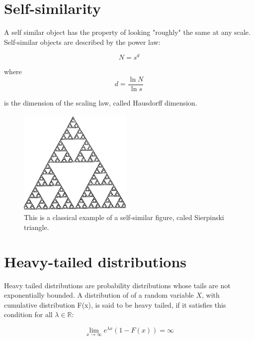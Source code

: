 \section{Self-similarity}

A self similar object has the property of looking "roughly" the same at any scale. Self-similar objects are described by the power law:

\begin{equation}
	N = s^{d}
\end{equation}

where 
\begin{equation}
	d = \frac{\ln{N}}{\ln{s}}
\end{equation}

is the dimension of the scaling law, called  Hausdorff dimension\cite{web-self-similar}. 


\begin{figure}[ht!]
	\centering
	\includegraphics[height=2.0in]{figures/apA/tritrans}
	\caption{This is a classical example of a self-similar figure, caled Sierpinski triangle.}
	\label{fig:self-similar-figure-example}
\end{figure}


\section{Heavy-tailed distributions}

Heavy tailed distributions are probability distributions whose tails are not exponentially bounded.  A distribution of of a random variable $X$, with cumulative distribution F(x), is said to be heavy tailed, if it satisfies this condition for all $\lambda \in \mathbb{R}$:

\begin{equation}
	\lim_{x\to\infty} e^{\lambda x} (1 - F(x)) = \infty
\end{equation}


